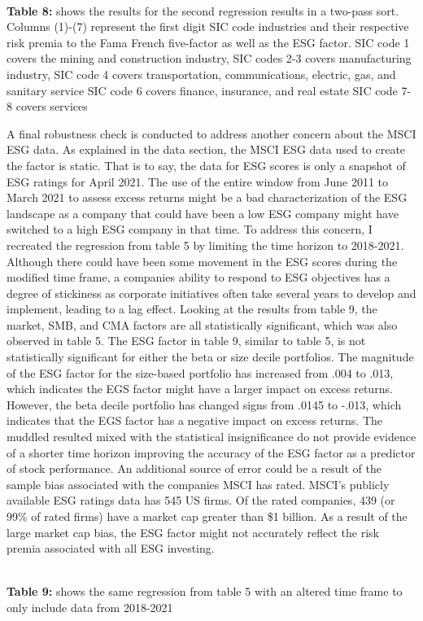 \begin{center}
    \paperspacingnarrow
    \\
    \textbf{Table 8:} shows the results for the second regression results in a two-pass sort. Columns (1)-(7) represent the first digit SIC code industries and their respective risk premia to the Fama French five-factor as well as the ESG factor. SIC code 1 covers the mining and construction industry, SIC codes 2-3 covers manufacturing industry, SIC code 4 covers transportation, communications, electric, gas, and sanitary service SIC code 6 covers finance, insurance, and real estate SIC code 7-8 covers services\\
    
    \paperspacingwide
\end{center}
 
A final robustness check is conducted to address another concern about the MSCI ESG data. As explained in the data section, the MSCI ESG data used to create the factor is static. That is to say, the data for ESG scores is only a snapshot of ESG ratings for April 2021. The use of the entire window from June 2011 to March 2021 to assess excess returns might be a bad characterization of the ESG landscape as a company that could have been a low ESG company might have switched to a high ESG company in that time. To address this concern, I recreated the regression from table 5 by limiting the time horizon to 2018-2021. Although there could have been some movement in the ESG scores during the modified time frame, a companies ability to respond to ESG objectives has a degree of stickiness as corporate initiatives often take several years to develop and implement, leading to a lag effect.  Looking at the results from table 9, the market, SMB, and CMA factors are all statistically significant, which was also observed in table 5. The ESG factor in table 9, similar to table 5, is not statistically significant for either the beta or size decile portfolios. The magnitude of the  ESG factor for the size-based portfolio has increased from .004 to .013, which indicates the EGS factor might have a larger impact on excess returns. However, the beta decile portfolio has changed signs from .0145 to -.013, which indicates that the EGS factor has a negative impact on excess returns. The muddled resulted mixed with the statistical insignificance do not provide evidence of a shorter time horizon improving the accuracy of the ESG factor as a predictor of stock performance. An additional source of error could be a result of the sample bias associated with the companies MSCI has rated. MSCI's publicly available ESG ratings data has 545 US firms. Of the rated companies, 439 (or 99\% of rated firms) have a market cap greater than \$1 billion. As a result of the large market cap bias, the ESG factor might not accurately reflect the risk premia associated with all ESG investing. 
 
 \begin{center}
    \paperspacingnarrow
    \\
    \textbf{Table 9:} shows the same regression from table 5 with an altered time frame to only include data from 2018-2021
    \paperspacingwide
\end{center}
 
 

